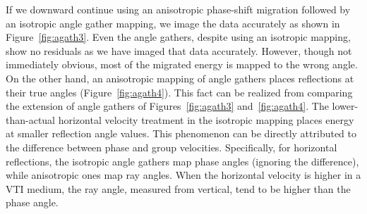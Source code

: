If we downward continue using an anisotropic phase-shift
migration followed by an isotropic angle gather mapping, 
we image the data accurately as shown in Figure~\ref{fig:agath3}. Even the angle gathers, despite using an isotropic mapping,
show no residuals as we have imaged that data accurately. However, though not immediately obvious, most of the migrated energy is mapped to the wrong angle.
On the other hand, an anisotropic mapping of angle gathers places reflections at their true angles (Figure~\ref{fig:agath4}). This fact can be realized from comparing
the extension of angle gathers of Figures~\ref{fig:agath3} and~\ref{fig:agath4}. The lower-than-actual horizontal velocity treatment in the isotropic mapping
places energy at smaller reflection angle values. This phenomenon can be directly attributed to the difference between phase and group velocities. Specifically, for
horizontal reflections, the isotropic angle gathers map phase angles (ignoring the difference), while anisotropic ones map
ray angles. When the horizontal velocity is higher in a VTI medium, the ray angle, measured from vertical, tend to be higher than the phase angle.

\begin{comment}
Finally, a mix of isotropic downward continuation
and anisotropic angle-gathers mapping reveals more of the features of the new mapping equation. Figure~\ref{fig:agath55} displays the result and
clearly the angle gather is different than that shown in Figure~\ref{fig:agath2} with the isotropic mapping. For one moveouts are clearly more stretched out over 
angles.
\end{comment}






